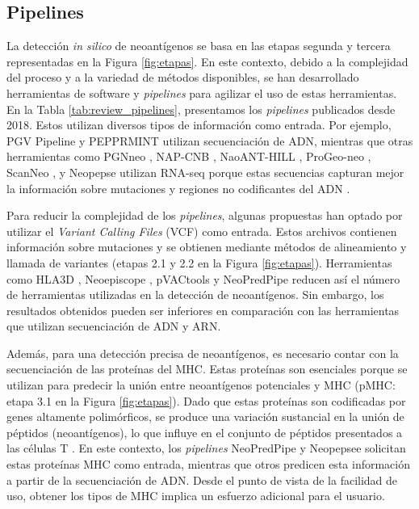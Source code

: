 \subsection{Pipelines}

La detección \textit{in silico} de neoantígenos se basa en las etapas segunda y tercera representadas en la Figura \ref{fig:etapas}. En este contexto, debido a la complejidad del proceso y a la variedad de métodos disponibles, se han desarrollado herramientas de software y \textit{pipelines} para agilizar el uso de estas herramientas. En la Tabla \ref{tab:review_pipelines}, presentamos los \textit{pipelines} publicados desde 2018. Estos utilizan diversos tipos de información como entrada. Por ejemplo, PGV Pipeline \citep{rubinsteyn2018computational} y PEPPRMINT \citep{zhou2023prioritizing} utilizan secuenciación de ADN, mientras que otras herramientas como PGNneo \citep{tan2023pgnneo}, NAP-CNB \citep{wert2021predicting}, NaoANT-HILL \citep{coelho2020neoant}, ProGeo-neo \citep{li2020progeo}, ScanNeo \citep{wang2019scanneo}, y Neopepse \citep{kim2018neopepsee} utilizan RNA-seq porque estas secuencias capturan mejor la información sobre mutaciones y regiones no codificantes del ADN \citep{tan2023pgnneo}.

Para reducir la complejidad de los \textit{pipelines}, algunas propuestas han optado por utilizar el \textit{Variant Calling Files} (VCF) como entrada. Estos archivos contienen información sobre mutaciones y se obtienen mediante métodos de alineamiento y llamada de variantes (etapas 2.1 y 2.2 en la Figura \ref{fig:etapas}). Herramientas como HLA3D \citep{li2022hla3d}, Neoepiscope \citep{wood2020neoepiscope}, pVACtools \citep{hundal2020pvactools} y NeoPredPipe \citep{schenck2019neopredpipe} reducen así el número de herramientas utilizadas en la detección de neoantígenos. Sin embargo, los resultados obtenidos pueden ser inferiores en comparación con las herramientas que utilizan secuenciación de ADN y ARN.

Además, para una detección precisa de neoantígenos, es necesario contar con la secuenciación de las proteínas del  MHC. Estas proteínas son esenciales porque se utilizan para predecir la unión entre neoantígenos potenciales y MHC (pMHC: etapa 3.1 en la Figura \ref{fig:etapas}). Dado que estas proteínas son codificadas por genes altamente polimórficos, se produce una variación sustancial en la unión de péptidos (neoantígenos), lo que influye en el conjunto de péptidos presentados a las células T \citep{abualrous2021major}. En este contexto, los \textit{pipelines} NeoPredPipe \citep{schenck2019neopredpipe} y Neopepsee \citep{kim2018neopepsee} solicitan estas proteínas MHC como entrada, mientras que otros predicen esta información a partir de la secuenciación de ADN. Desde el punto de vista de la facilidad de uso, obtener los tipos de MHC implica un esfuerzo adicional para el usuario.

